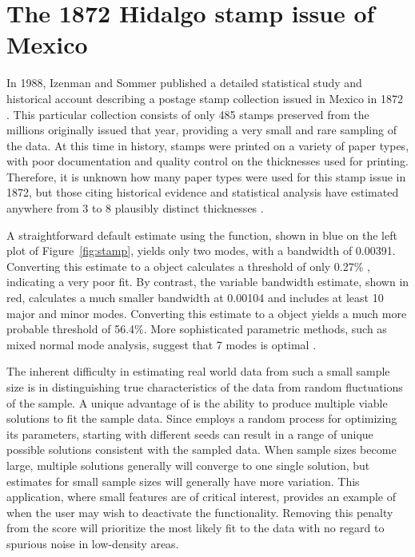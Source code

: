 \section{The 1872 Hidalgo stamp issue of Mexico} \label{sec:stamps}

In 1988, Izenman and Sommer published a detailed statistical study and historical account describing a postage stamp collection issued in Mexico in 1872 \citep{stamp3}. This particular collection consists of only 485 stamps preserved from the millions originally issued that year, providing a very small and rare sampling of the data.  At this time in history, stamps were printed on a variety of paper types, with poor documentation and quality control on the thicknesses used for printing. Therefore, it is unknown how many paper types were used for this stamp issue in 1872, but those citing historical evidence and statistical analysis have estimated anywhere from 3 to 8 plausibly distinct thicknesses \citep{stamp1, stamp2, stamp3, stamp4}. 

A straightforward default estimate using the  function, shown in blue on the left plot of Figure~\ref{fig:stamp}, yields only two modes, with a bandwidth of 0.00391. Converting this estimate to a  object calculates a threshold of only 0.27\% , indicating a very poor fit. By contrast, the  variable bandwidth estimate, shown in red, calculates a much smaller bandwidth at 0.00104 and includes at least 10 major and minor modes. Converting this estimate to a  object yields a much more probable threshold of 56.4\%. More sophisticated parametric methods, such as mixed normal mode analysis, suggest that 7 modes is optimal \citep{stamp1, stamp3}.

The inherent difficulty in estimating real world data from such a small sample size is in distinguishing true characteristics of the data from random fluctuations of the sample. A unique advantage of  is the ability to produce multiple viable solutions to fit the sample data. Since  employs a random process for optimizing its parameters, starting with different seeds can result in a range of unique possible solutions consistent with the sampled data. When sample sizes become large, multiple solutions generally will converge to one single solution, but estimates for small sample sizes will generally have more variation. This application, where small features are of critical interest, provides an example of when the user may wish to deactivate the  functionality. Removing this penalty from the score will prioritize the most likely fit to the data with no regard to spurious noise in low-density areas.

